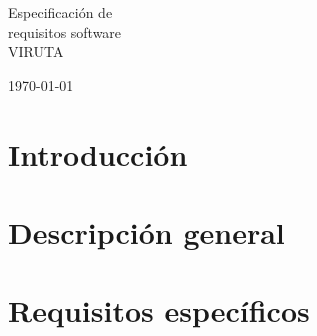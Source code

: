 \documentclass[11pt,a4paper]{article}
\begin{document}
\begin{titlepage}
\vspace*{8cm}
\begin{center}
{\Huge \textsf{Especificación de \\ requisitos software \\ VIRUTA}}\\

\vspace*{2cm}

\textsf{\Large \today}
\end{center}
\end{titlepage}

\tableofcontents
\thispagestyle{empty}
\newpage


\section{Introducción}



\section{Descripción general}



\section{Requisitos específicos}


\end{document}
